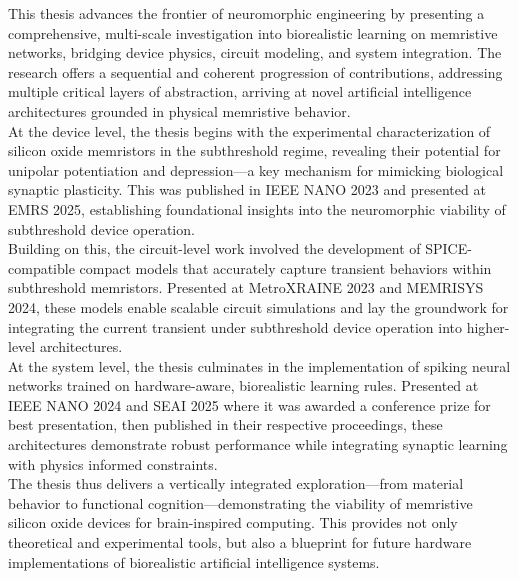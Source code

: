 
\begin{impact}      

\noindent This thesis advances the frontier of neuromorphic engineering by presenting a comprehensive, multi-scale investigation into biorealistic learning on memristive networks, bridging device physics, circuit modeling, and system integration. The research offers a sequential and coherent progression of contributions, addressing multiple critical layers of abstraction, arriving at novel artificial intelligence architectures grounded in physical memristive behavior. \\

\noindent At the device level, the thesis begins with the experimental characterization of silicon oxide memristors in the subthreshold regime, revealing their potential for unipolar potentiation and depression—a key mechanism for mimicking biological synaptic plasticity. This was published in IEEE NANO 2023 and presented at EMRS 2025, establishing foundational insights into the neuromorphic viability of subthreshold device operation. \\

\noindent Building on this, the circuit-level work involved the development of SPICE-compatible compact models that accurately capture transient behaviors within subthreshold memristors. Presented at MetroXRAINE 2023 and MEMRISYS 2024, these models enable scalable circuit simulations and lay the groundwork for integrating the current transient under subthreshold device operation into higher-level architectures. \\

\noindent At the system level, the thesis culminates in the implementation of spiking neural networks trained on hardware-aware, biorealistic learning rules. Presented at IEEE NANO 2024 and SEAI 2025 where it was awarded a conference prize for best presentation, then published in their respective proceedings, these architectures demonstrate robust performance while integrating synaptic learning with physics informed constraints. \\

\noindent The thesis thus delivers a vertically integrated exploration—from material behavior to functional cognition—demonstrating the viability of memristive silicon oxide devices for brain-inspired computing. This provides not only theoretical and experimental tools, but also a blueprint for future hardware implementations of biorealistic artificial intelligence systems.\\


\end{impact}
